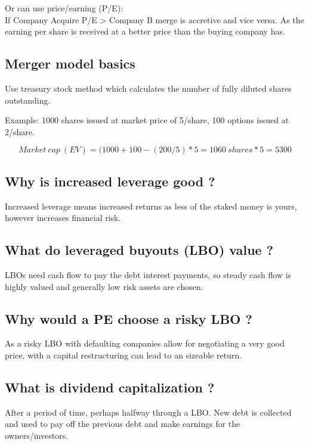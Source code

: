 \documentclass[11pt]{scrartcl} %
\begin{document}
Or can use price/earning (P/E):\\

If Company Acquire P/E > Company B merge is accretive and vice versa. As the earning per share is received at a better price than the buying company has.

\subsection{Merger model basics}

Use treasury stock method which calculates the number of fully diluted shares outstanding.

Example: 1000 shares issued at market price of 5/share, 100 options issued at 2/share.

\[ Market\:cap\:(EV) = (1000 + 100 - (200/5)*5 = 1060\:shares *5 = 5300 \]

\subsection{Why is increased leverage good ?}

Increased leverage means increased returns as less of the staked money is yours, however increases financial risk.

\subsection{What do leveraged buyouts (LBO) value ?}

LBOs need cash flow to pay the debt interest payments, so steady cash flow is highly valued and generally low risk assets are chosen. 

\subsection{Why would a PE choose a risky LBO ?}

As a risky LBO with defaulting companies allow for negotiating a very good price, with a capital restructuring can lead to an sizeable return.

\subsection{What is dividend capitalization ?}

After a period of time, perhaps halfway through a LBO. New debt is collected and used to pay off the previous debt and make earnings for the owners/investors. 
\end{document}
